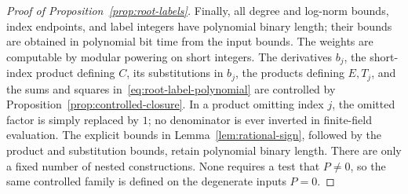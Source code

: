 \begin{proof}[Proof of Proposition~\ref{prop:root-labels}]
Finally, all degree and log-norm bounds, index endpoints, and label
integers have polynomial binary length; their bounds are obtained in
polynomial bit time from the input bounds.  The
weights are computable by modular powering on short integers.
The derivatives $b_j$, the short-index product defining $C$, its
substitutions in $b_j$, the products defining $E,T_j$, and the sums and
squares in~\eqref{eq:root-label-polynomial} are controlled by
Proposition~\ref{prop:controlled-closure}.  In a product omitting index $j$, the omitted
factor is simply replaced by $1$; no denominator is ever inverted in
finite-field evaluation.  The explicit bounds in
Lemma~\ref{lem:rational-sign}, followed by the product and substitution
bounds, retain polynomial binary length.  There are only a fixed number
of nested constructions.  None requires a test that $P\ne0$, so the
same controlled family is defined on the degenerate inputs $P=0$.
\end{proof}

